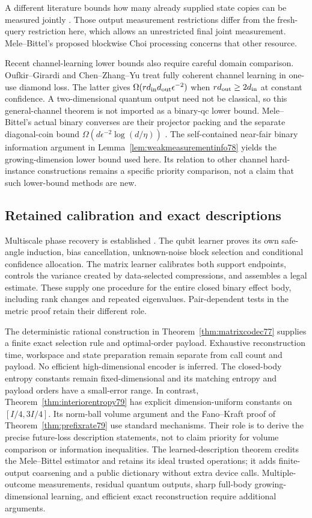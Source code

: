 A different literature bounds how many already supplied state
copies can be measured jointly \cite{CLL78,NZ78}. Those output
measurement restrictions differ from the fresh-query restriction
here, which allows an unrestricted final joint measurement.
Mele--Bittel's proposed blockwise Choi processing
\cite[Section~I.5]{MB67} concerns that other resource.

Recent channel-learning lower bounds also require careful domain
comparison. Oufkir--Girardi \cite{OG67} and Chen--Zhang--Yu
\cite[Theorems~1.1 and~4.2]{CZY78} treat fully coherent channel
learning in one-use diamond loss. The latter gives
$\Omega(rd_{\rm in}d_{\rm out}\epsilon^{-2})$ when
$rd_{\rm out}\ge2d_{\rm in}$ at constant confidence.
A two-dimensional quantum output need not be classical, so this
general-channel theorem is not imported as a binary-qc lower bound.
Mele--Bittel's actual binary converses are their projector packing
\cite[Proposition~IV.17]{MB67} and the separate diagonal-coin bound
$\Omega(d\epsilon^{-2}\log(d/\eta))$
\cite[Corollary~IV.20]{MB67}. The self-contained near-fair binary
information argument in Lemma~\ref{lem:weakmeasurementinfo78}
yields the growing-dimension lower bound used here. Its relation
to other channel hard-instance constructions remains a specific
priority comparison, not a claim that such lower-bound methods
are new.

\subsection{Retained calibration and exact descriptions}
Multiscale phase recovery is established \cite{HB76,KLY76}.
The qubit learner proves its own safe-angle induction, bias
cancellation, unknown-noise block selection and conditional
confidence allocation. The matrix learner calibrates both support
endpoints, controls the variance created by data-selected
compressions, and assembles a legal estimate. These supply one
procedure for the entire closed binary effect body, including
rank changes and repeated eigenvalues. Pair-dependent tests in the
metric proof retain their different role.

The deterministic rational construction in
Theorem~\ref{thm:matrixcodec77} supplies a finite exact selection
rule and optimal-order payload. Exhaustive reconstruction time,
workspace and state preparation remain separate from call count
and payload. No efficient high-dimensional encoder is inferred.
The closed-body entropy constants remain fixed-dimensional and its
matching entropy and payload orders have a small-error range.
In contrast, Theorem~\ref{thm:interiorentropy79} has explicit
dimension-uniform constants on $[I/4,3I/4]$. Its norm-ball volume
argument and the Fano--Kraft proof of
Theorem~\ref{thm:prefixrate79} use standard mechanisms. Their role
is to derive the precise future-loss description statements, not to
claim priority for volume comparison or information inequalities.
The learned-description theorem credits the Mele--Bittel estimator
and retains its ideal trusted operations; it adds finite-output
coarsening and a public dictionary without extra device calls.
Multiple-outcome measurements, residual quantum outputs, sharp
full-body growing-dimensional learning, and efficient exact
reconstruction require additional arguments.
